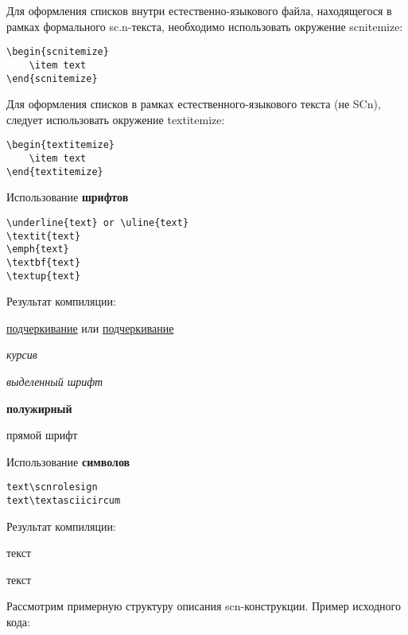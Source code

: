 Для оформления списков внутри естественно-языкового файла, находящегося в рамках формального sc.n-текста, необходимо использовать окружение scnitemize:
\begin{lstlisting}              
\begin{scnitemize}
	\item text
\end{scnitemize}
\end{lstlisting}  

Для оформления списков в рамках естественного-языкового текста (не SCn), следует использовать окружение textitemize:
\begin{lstlisting}              
\begin{textitemize}
	\item text
\end{textitemize}
\end{lstlisting}  

Использование \textbf{шрифтов}

\begin{lstlisting}
\underline{text} or \uline{text}
\textit{text}
\emph{text}
\textbf{text}
\textup{text}
\end{lstlisting}

Результат компиляции:

\underline{подчеркивание} или \uline{подчер\-кивание}

\textit{курсив}

\emph{выделенный шрифт}

\textbf{полужирный}

\textup{прямой шрифт}

Использование \textbf{символов}

\begin{lstlisting}
text\scnrolesign
text\textasciicircum
\end{lstlisting}

Результат компиляции:

	текст\scnrolesign
	
	текст\scnsupergroupsign

Рассмотрим примерную структуру описания scn-конструкции. Пример исходного кода:

